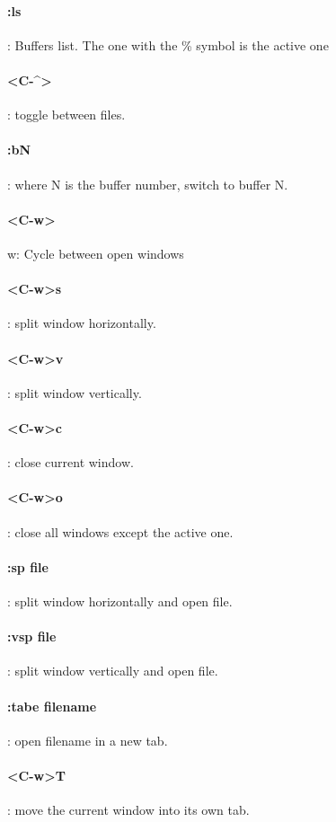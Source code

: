\documentclass[10pt,letterpaper]{book}
\begin{document}
\paragraph{:ls}: Buffers list. The one with the \% symbol is the active one
\paragraph{<C-\^{}>}: toggle between files.
\paragraph{:bN}: where N is the buffer number, switch to buffer N.
\paragraph{<C-w>}w: Cycle between open windows
\paragraph{<C-w>s}: split window horizontally.
\paragraph{<C-w>v}: split window vertically.
\paragraph{<C-w>c}: close current window.
\paragraph{<C-w>o}: close all windows except the active one.
\paragraph{:sp {file}}: split window horizontally and open {file}.
\paragraph{:vsp {file}}: split window vertically and open {file}.
\paragraph{:tabe {filename}}: open {filename} in a new tab.
\paragraph{<C-w>T}: move the current window into its own tab.
\end{document}
